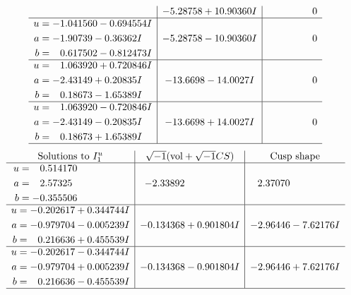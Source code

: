 \documentclass[1p]{elsarticle_modified}
\theoremstyle{definition}
\newcommand{\I}{\sqrt{-1}}
\begin{document}
$$\begin{array}{c|c|c}
 & -5.28758 + 10.90360 I & \phantom{-0.000000 } 0 \\ \hline\begin{aligned}
u &= -1.041560 - 0.694554 I \\
a &= -1.90739 - 0.36362 I \\
b &= \phantom{-}0.617502 - 0.812473 I\end{aligned}
 & -5.28758 - 10.90360 I & \phantom{-0.000000 } 0 \\ \hline\begin{aligned}
u &= \phantom{-}1.063920 + 0.720846 I \\
a &= -2.43149 + 0.20835 I \\
b &= \phantom{-}0.18673 - 1.65389 I\end{aligned}
 & -13.6698 - 14.0027 I & \phantom{-0.000000 } 0 \\ \hline\begin{aligned}
u &= \phantom{-}1.063920 - 0.720846 I \\
a &= -2.43149 - 0.20835 I \\
b &= \phantom{-}0.18673 + 1.65389 I\end{aligned}
 & -13.6698 + 14.0027 I & \phantom{-0.000000 } 0\\
 \hline 
 \end{array}$$\newpage$$\begin{array}{c|c|c}  
\text{Solutions to }I^u_{1}& \I (\text{vol} + \sqrt{-1}CS) & \text{Cusp shape}\\
 \hline 
\begin{aligned}
u &= \phantom{-}0.514170\phantom{ +0.000000I} \\
a &= \phantom{-}2.57325\phantom{ +0.000000I} \\
b &= -0.355506\phantom{ +0.000000I}\end{aligned}
 & -2.33892\phantom{ +0.000000I} & \phantom{-}2.37070\phantom{ +0.000000I} \\ \hline\begin{aligned}
u &= -0.202617 + 0.344744 I \\
a &= -0.979704 - 0.005239 I \\
b &= \phantom{-}0.216636 + 0.455539 I\end{aligned}
 & -0.134368 + 0.901804 I & -2.96446 - 7.62176 I \\ \hline\begin{aligned}
u &= -0.202617 - 0.344744 I \\
a &= -0.979704 + 0.005239 I \\
b &= \phantom{-}0.216636 - 0.455539 I\end{aligned}
 & -0.134368 - 0.901804 I & -2.96446 + 7.62176 I\\
 \hline 
 \end{array}$$\newpage\newpage\renewcommand{\arraystretch}{1}
\end{document}
